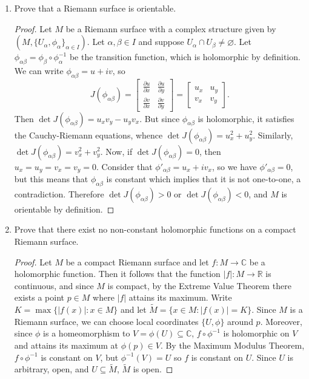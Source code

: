 \documentclass[11pt,oneside,english]{amsart}
\theoremstyle{definition}
\newcommand{\lspace}{\vspace{5mm}}
\newcommand{\pp}[2]{\frac{\partial{#1}}{\partial{#2}}}
\newcommand{\MB}[1]{\mathbb{#1}}
\begin{document}
\rightline{\today}

\lspace




\begin{enumerate}[leftmargin=*]
\itemsep5mm

\item Prove that a Riemann surface is orientable.

\begin{proof}
Let $M$ be a Riemann surface with a complex structure given by $(M,\{U_\alpha,\phi_\alpha\}_{\alpha\in I})$. Let $\alpha,\beta\in I$ and suppose $U_\alpha\cap U_\beta\neq\varnothing$. Let $\phi_{\alpha\beta}=\phi_\beta\circ\phi_\alpha^{-1}$ be the transition function, which is holomorphic by definition. We can write $\phi_{\alpha\beta}=u+iv$, so
\[
J(\phi_{\alpha\beta})=\begin{bmatrix}\pp{u}{x} & \pp{u}{y} \\ \pp{v}{x} & \pp{v}{y}\end{bmatrix}=\begin{bmatrix}u_x & u_y \\ v_x & v_y \end{bmatrix}.
\]
Then $\det J(\phi_{\alpha\beta})=u_xv_y-u_yv_x$. But since $\phi_{\alpha\beta}$ is holomorphic, it satisfies the Cauchy-Riemann equations, whence $\det J(\phi_{\alpha\beta})=u_x^2+u_y^2$. Similarly, $\det J(\phi_{\alpha\beta})=v_x^2+v_y^2$. Now, if $\det J(\phi_{\alpha\beta})=0$, then $u_x=u_y=v_x=v_y=0$. Consider that $\phi'_{\alpha\beta}=u_x+iv_x$, so we have $\phi'_{\alpha\beta}=0$, but this means that $\phi_{\alpha\beta}$ is constant which implies that it is not one-to-one, a contradiction. Therefore $\det J(\phi_{\alpha\beta})>0$ or $\det J(\phi_{\alpha\beta})<0$, and $M$ is orientable by definition.
\end{proof}

\item Prove that there exist no non-constant holomorphic functions on a compact Riemann surface.

\begin{proof}
Let $M$ be a compact Riemann surface and let $f:M\to \MB{C}$ be a holomorphic function. Then it follows that the function $|f|:M\to\MB{R}$ is continuous, and since $M$ is compact, by the Extreme Value Theorem there exists a point $p\in M$ where $|f|$ attains its maximum. Write $K=\max\{|f(x)|: x\in M\}$ and let $\tilde M=\{x\in M:|f(x)|=K\}$. Since $M$ is a Riemann surface, we can choose local coordinates $\{U,\phi\}$ around $p$. Moreover, since $\phi$ is a homeomorphism to $V=\phi(U)\subseteq\MB{C}$, $f\circ\phi^{-1}$ is holomorphic on $V$ and attains its maximum at $\phi(p)\in V$. By the Maximum Modulus Theorem, $f\circ\phi^{-1}$ is constant on $V$, but $\phi^{-1}(V)=U$ so $f$ is constant on $U$. Since $U$ is arbitrary, open, and $U\subseteq \tilde M$, $\tilde M$ is open.


\end{proof}
\end{enumerate}
\end{document}
